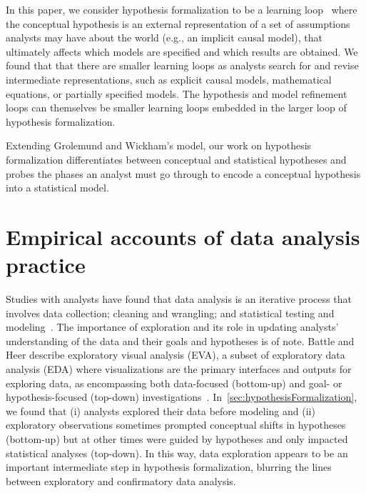 In this paper, we consider hypothesis formalization to be a learning loop~\cite{russell1993cost} where
the conceptual hypothesis is an external representation of a set of assumptions
analysts may have about the world (e.g., an implicit causal model), that ultimately
affects which models are specified and which results are
obtained. We found that that there are smaller learning loops as analysts search
for and revise intermediate representations, such as explicit causal models,
mathematical equations, or partially specified models. The
hypothesis and model refinement loops can themselves be smaller learning loops
embedded in the larger loop of hypothesis formalization. 

Extending Grolemund and Wickham's model, our work on
 hypothesis formalization differentiates between conceptual and statistical
 hypotheses and probes the phases an analyst must go through to encode a
 conceptual hypothesis into a statistical model.


\section{Empirical accounts of data analysis practice}
Studies with analysts have found that data analysis is an iterative process that
involves data collection; cleaning and wrangling; and statistical testing and
modeling~\cite{kandel2012enterprise,alspaugh2018futzing,wongsuphasawat2019EDAgoals,grolemund2014cognitive,liu2019paths,liu2019understanding}.
The importance of exploration and its role in updating analysts' understanding
of the data and their goals and hypotheses is of note. Battle and Heer describe
exploratory visual analysis (EVA), a subset of exploratory data analysis (EDA)
where visualizations are the primary interfaces and outputs for exploring data,
as encompassing both data-focused (bottom-up) and goal- or hypothesis-focused
(top-down) investigations~\cite{battle2019EVA}.
In~\autoref{sec:hypothesisFormalization}, we found that (i) analysts explored
their data before modeling and (ii) exploratory observations sometimes prompted
conceptual shifts in hypotheses (bottom-up) but at other times were guided by
hypotheses and only impacted statistical analyses (top-down). In this way, data
exploration appears to be an important intermediate step in hypothesis
formalization, blurring the lines between exploratory and confirmatory data
analysis. 


